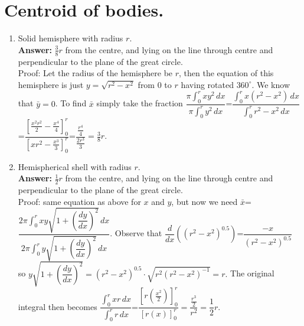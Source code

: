 \documentclass[11pt,a4paper]{article}
\begin{document}
\section {Centroid of bodies.}
\begin{enumerate}
\item Solid hemisphere with radius $r$.\\
\textbf {Answer:} $\frac{3}{8}r$ from the centre, and lying on the line through centre and perpendicular to the plane of the great circle.\\
Proof: Let the radius of the hemisphere be $r$, then the equation of this hemisphere is just $y=\sqrt{r^2-x^2}$ from 0 to $r$ having rotated $360^{\circ}$. We know that $\bar{y}=0$. To find $\bar{x}$ simply take the fraction $\dfrac{\pi\int _0^r xy^2\, dx}{\pi\int_0^r y^2\, dx}$=$\dfrac{\int _0^r x(r^2-x^2)\, dx}{\int_0^r r^2-x^2\, dx}$=$\dfrac{[\frac{x^2r^2}{2}-\frac{x^4}{4}]^r_0}{[xr^2-\frac{x^3}{3}]^r_0}$=$\dfrac{\frac{r^4}{4}}{\frac{2r^3}{3}}=\frac{3}{8}r.$

\item Hemispherical shell with radius $r$.\\ 
\textbf {Answer:} $\frac{1}{2}r$ from the centre, and lying on the line through centre and perpendicular to the plane of the great circle.\\
Proof: same equation as above for $x$ and $y$, but now we need $\bar{x}$=$\dfrac{2\pi\int_0^r xy\sqrt{1+\left(\dfrac{dy}{dx}\right)^{2}}\, dx}{2\pi\int_0^r y\sqrt{1+\left(\dfrac{dy}{dx}\right)^{2}}\, dx}$. Observe that $\dfrac{d}{dx}((r^2-x^2)^{0.5})$=$\dfrac{-x}{(r^2-x^2)^{0.5}}$ so $y\sqrt{1+\left(\dfrac{dy}{dx}\right)^{2}}=(r^2-x^2)^{0.5}\cdot\sqrt{r^{2}(r^2-x^2)^{-1}}=r.$ The original integral then becomes $\dfrac{\int_0^r xr\,dx}{\int_0^r r\,dx}$=$\dfrac{[r(\frac{x^2}{2})]_0^r}{[r(x)]_0^r}=\dfrac{\frac{r^3}{2}}{r^2}=\dfrac{1}{2}r.$


\end{enumerate}
\end{document}
